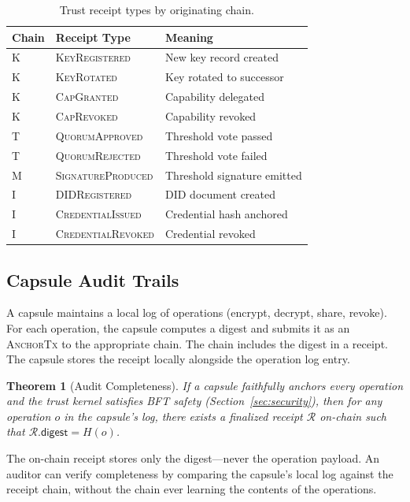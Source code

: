 \documentclass[11pt,a4paper]{article}
\newtheorem{theorem}{Theorem}[section]
\begin{document}
\begin{table}[h]
\centering
\caption{Trust receipt types by originating chain.}
\label{tab:receipts}
\begin{tabular}{llp{6cm}}
\toprule
\textbf{Chain} & \textbf{Receipt Type} & \textbf{Meaning} \\
\midrule
K & \textsc{KeyRegistered} & New key record created \\
K & \textsc{KeyRotated} & Key rotated to successor \\
K & \textsc{CapGranted} & Capability delegated \\
K & \textsc{CapRevoked} & Capability revoked \\
T & \textsc{QuorumApproved} & Threshold vote passed \\
T & \textsc{QuorumRejected} & Threshold vote failed \\
M & \textsc{SignatureProduced} & Threshold signature emitted \\
I & \textsc{DIDRegistered} & DID document created \\
I & \textsc{CredentialIssued} & Credential hash anchored \\
I & \textsc{CredentialRevoked} & Credential revoked \\
\bottomrule
\end{tabular}
\end{table}

\subsection{Capsule Audit Trails}

A capsule maintains a local log of operations (encrypt, decrypt, share, revoke).
For each operation, the capsule computes a digest and submits it as an
\textsc{AnchorTx} to the appropriate chain. The chain includes the digest in a
receipt. The capsule stores the receipt locally alongside the operation log entry.

\begin{theorem}[Audit Completeness]\label{thm:audit}
If a capsule faithfully anchors every operation and the trust kernel satisfies
BFT safety (Section~\ref{sec:security}), then for any operation $o$ in the
capsule's log, there exists a finalized receipt $\mathcal{R}$ on-chain such that
$\mathcal{R}.\mathsf{digest} = H(o)$.
\end{theorem}

The on-chain receipt stores only the digest---never the operation payload. An
auditor can verify completeness by comparing the capsule's local log against the
receipt chain, without the chain ever learning the contents of the operations.
\end{document}
